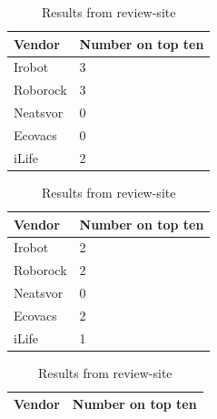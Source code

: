 \begin{table}[H]
    \centering
    \begin{subtable}[b]{0.45\linewidth}
        \centering
        \caption{Results from review-site \cite{robotsel11}}
        \label{tab:RobotReviw1}
        \begin{tabular}{|l|l|}
            \hline 
            \textbf{Vendor} & \textbf{Number on top ten} \\ \hline
            Irobot      & 3                 \\                   \hline
            Roborock    & 3                 \\                   \hline
            Neatsvor    & 0                 \\                   \hline
            Ecovacs     & 0                 \\                   \hline
            iLife       & 2                 \\                   \hline
        \end{tabular}
    \end{subtable}
    \hspace{0.5cm}
    \begin{subtable}[b]{0.45\linewidth}
        \centering
        \caption{Results from review-site \cite{robotsel12}}
        \label{tab:RobotReviw2}
        \begin{tabular}{|l|l|}
            \hline
            \textbf{Vendor}    & \textbf{Number on top ten} \\ \hline
            Irobot      & 2                 \\                   \hline
            Roborock    & 2                 \\                   \hline
            Neatsvor    & 0                 \\                   \hline
            Ecovacs     & 2                 \\                   \hline
            iLife       & 1                 \\                   \hline
        \end{tabular}
    \end{subtable}
    \begin{subtable}[b]{0.45\linewidth}
        \centering
        \caption{Results from review-site \cite{robotsel13}}
        \label{tab:RobotReviw2}
        \begin{tabular}{|l|l|}
            \hline
            \textbf{Vendor}    & \textbf{Number on top ten} \\ \hline

\end{tabular}
\end{subtable}
\end{table}
